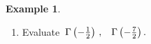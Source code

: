 \documentclass[12pt,a4paper]{report}
\theoremstyle{definition}
\newtheorem{exa}[thm]{Example}
\theoremstyle{plain}
\begin{document}
\begin{exa}
\begin{enumerate}
\begin{enumerate}
\item[(iv).] Evaluate $\, \Gamma\left(-\frac{1}{2}\right)\, ,\hspace{0.3cm} \Gamma\left(-\frac{7}{2}\right).$
\end{enumerate}

\end{enumerate}
\end{exa}
\end{document}
